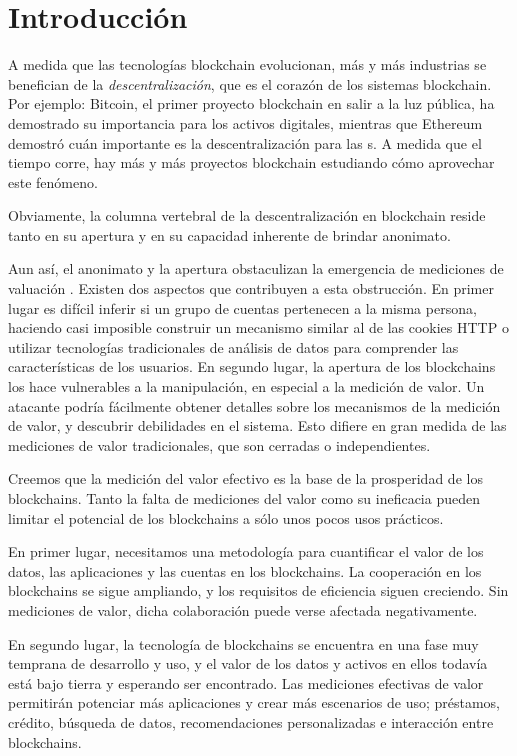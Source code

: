 
\section{Introducción}

A medida que las tecnologías blockchain evolucionan, más y más industrias se benefician de la \emph{descentralización}, que es el corazón de los sistemas blockchain. Por ejemplo: Bitcoin, el primer proyecto blockchain en salir a la luz pública, ha demostrado su importancia para los activos digitales, mientras que Ethereum demostró cuán importante es la descentralización para las {\dapp}s. A medida que el tiempo corre, hay más y más proyectos blockchain estudiando cómo aprovechar este fenómeno.

Obviamente, la columna vertebral de la descentralización en blockchain reside tanto en su apertura y en su capacidad inherente de brindar anonimato.

Aun así, el anonimato y la apertura obstaculizan la emergencia de mediciones de valuación \cite{meiklejohn2013fistful}. Existen dos aspectos que contribuyen a esta obstrucción. En primer lugar es difícil inferir si un grupo de cuentas pertenecen a la misma persona, haciendo casi imposible construir un mecanismo similar al de las cookies HTTP \cite{Cookie} o utilizar tecnologías tradicionales de análisis de datos para comprender las características de los usuarios.
En segundo lugar, la apertura de los blockchains los hace vulnerables a la manipulación,
en especial a la medición de valor. Un atacante podría fácilmente obtener detalles sobre los mecanismos de la medición de valor, y descubrir debilidades en el sistema. Esto difiere en gran medida de las mediciones de valor tradicionales, que son cerradas o independientes.

Creemos que la medición del valor efectivo es la base de la prosperidad de los blockchains. Tanto la falta de mediciones del valor como su ineficacia pueden limitar el potencial de los blockchains a sólo unos pocos usos prácticos.

En primer lugar, necesitamos una metodología para cuantificar el valor de los datos, las aplicaciones y las cuentas en los blockchains. La cooperación en los blockchains se sigue ampliando, y los requisitos de eficiencia siguen creciendo. Sin mediciones de valor, dicha colaboración puede verse afectada negativamente.

En segundo lugar, la tecnología de blockchains se encuentra en una fase muy temprana de desarrollo y uso, y el valor de los datos y activos en ellos todavía está bajo tierra y esperando ser encontrado. Las mediciones efectivas de valor permitirán potenciar más aplicaciones y crear más escenarios de uso; préstamos, crédito, búsqueda de datos, recomendaciones personalizadas e interacción entre blockchains.

